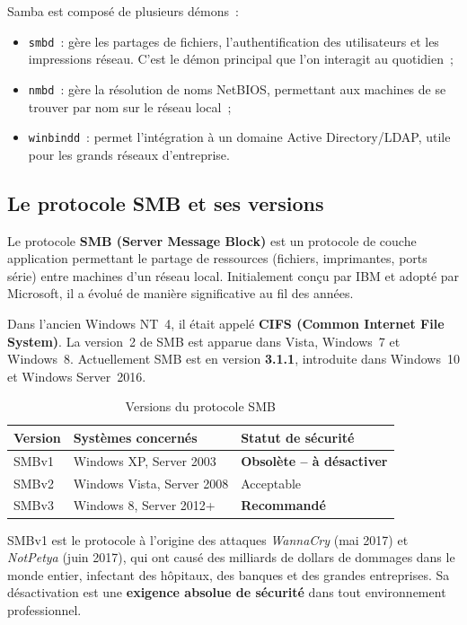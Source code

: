 \documentclass[12pt,a4paper]{article}
\begin{document}
Samba est composé de plusieurs démons~:
\begin{itemize}[leftmargin=2em]
  \item \texttt{smbd}~: gère les partages de fichiers, l'authentification des utilisateurs et
    les impressions réseau. C'est le démon principal que l'on interagit au quotidien~;
  \item \texttt{nmbd}~: gère la résolution de noms NetBIOS, permettant aux machines de
    se trouver par nom sur le réseau local~;
  \item \texttt{winbindd}~: permet l'intégration à un domaine Active Directory/LDAP,
    utile pour les grands réseaux d'entreprise.
\end{itemize}

\subsection{Le protocole SMB et ses versions}

Le protocole \textbf{SMB (Server Message Block)} est un protocole de couche application
permettant le partage de ressources (fichiers, imprimantes, ports série) entre machines d'un
réseau local. Initialement conçu par IBM et adopté par Microsoft, il a évolué de manière
significative au fil des années.

Dans l'ancien Windows NT~4, il était appelé \textbf{CIFS (Common Internet File System)}.
La version~2 de SMB est apparue dans Vista, Windows~7 et Windows~8. Actuellement
SMB est en version \textbf{3.1.1}, introduite dans Windows~10 et Windows Server~2016.

\begin{table}[H]
  \centering
  \begin{tabular}{lll}
    \toprule
    \textbf{Version} & \textbf{Systèmes concernés} & \textbf{Statut de sécurité} \\
    \midrule
    SMBv1 & Windows XP, Server 2003   & \textcolor{alertred}{\textbf{Obsolète -- à désactiver}} \\
    SMBv2 & Windows Vista, Server 2008 & Acceptable \\
    SMBv3 & Windows 8, Server 2012+   & \textcolor{successgreen}{\textbf{Recommandé}} \\
    \bottomrule
  \end{tabular}
  \caption{Versions du protocole SMB}
\end{table}

\begin{warningbox}
SMBv1 est le protocole à l'origine des attaques \textit{WannaCry} (mai 2017) et
\textit{NotPetya} (juin 2017), qui ont causé des milliards de dollars de dommages dans le
monde entier, infectant des hôpitaux, des banques et des grandes entreprises. Sa
désactivation est une \textbf{exigence absolue de sécurité} dans tout environnement
professionnel.
\end{warningbox}
\end{document}
